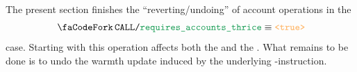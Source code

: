 \begin{center}
\end{center}
The present section finishes the ``reverting/undoing'' of account operations in the
\[
	\scenCallRequiresAccountsThrice \equiv \true
\]
case.
Starting with \cite{EIP-7702} this operation affects both the
\calleeName{} and the
\delegateName{}.
What remains to be done is to undo the warmth update induced by the underlying -instruction.
\begin{description}
		
		
\end{description}
